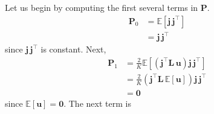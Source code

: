 Let us begin by computing the first several terms in $\mathbf{P}$.
%
\begin{align}
    \mathbf{P}_0 & = \mathbb{E}\left[ \mathbf{j} \, \mathbf{j}^\top \right]
    \nonumber                                                               \\
                 & = \mathbf{j} \, \mathbf{j}^\top
\end{align}
%
since $\mathbf{j} \, \mathbf{j}^\top$ is constant. Next,
%
\begin{align}
    \mathbf{P}_1 & = \frac{2}{K}\mathbb{E}\left[ \left(\mathbf{j}^\top \mathbf{L} \, \mathbf{u}\right) \mathbf{j} \, \mathbf{j}^\top \right]
    \nonumber                                                                                                                                \\
                 & = \frac{2}{K}\left(\mathbf{j}^\top \mathbf{L} \, \mathbb{E}\left[ \mathbf{u} \right]\right) \mathbf{j} \, \mathbf{j}^\top
    \nonumber                                                                                                                                \\
                 & = \mathbf{0}
\end{align}
%
since $\mathbb{E}\left[ \mathbf{u} \right] = \mathbf{0}$. The next term is
%
